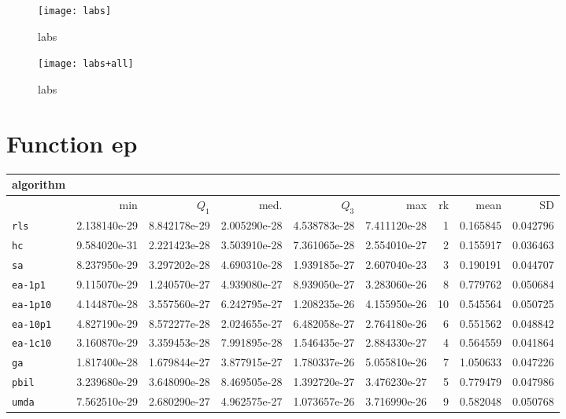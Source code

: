 \begin{center}
\begin{figure}[h]
\centering
\texttt{[image: labs]}
\caption{labs}
\end{figure}
\end{center}

\begin{center}
\begin{figure}[h]
\centering
\texttt{[image: labs+all]}
\caption{labs}
\end{figure}
\end{center}

\newpage

\section{Function ep}
\begin{center}
\begin{tabular}{@{}l*{5}{>{{}}N{1}{2}}>{{}}N{2}{0}N{1}{3}N{1}{3}@{}}
\toprule
{algorithm} &  &  \\
\midrule
& {min} & {$Q_1$} & {med.} & {$Q_3$} & {max} & {rk} & {mean} & {SD} \\
\midrule
\verb|rls| & 2.138140e-29 & {\color{blue}} 8.842178e-29 & {\color{blue}} 2.005290e-28 & {\color{blue}} 4.538783e-28 & {\color{blue}} 7.411120e-28 & 1 & 0.165845 & 0.042796 \\
 \verb|hc| & {\color{blue}} 9.584020e-31 & 2.221423e-28 & 3.503910e-28 & 7.361065e-28 & 2.554010e-27 & 2 & 0.155917 & 0.036463 \\
 \verb|sa| & 8.237950e-29 & 3.297202e-28 & 4.690310e-28 & 1.939185e-27 & 2.607040e-23 & 3 & 0.190191 & 0.044707 \\
 \verb|ea-1p1| & 9.115070e-29 & 1.240570e-27 & 4.939080e-27 & 8.939050e-27 & 3.283060e-26 & 8 & 0.779762 & 0.050684 \\
 \verb|ea-1p10| & 4.144870e-28 & 3.557560e-27 & 6.242795e-27 & 1.208235e-26 & 4.155950e-26 & 10 & 0.545564 & 0.050725 \\
 \verb|ea-10p1| & 4.827190e-29 & 8.572277e-28 & 2.024655e-27 & 6.482058e-27 & 2.764180e-26 & 6 & 0.551562 & 0.048842 \\
 \verb|ea-1c10| & 3.160870e-29 & 3.359453e-28 & 7.991895e-28 & 1.546435e-27 & 2.884330e-27 & 4 & 0.564559 & 0.041864 \\
 \verb|ga| & 1.817400e-28 & 1.679844e-27 & 3.877915e-27 & 1.780337e-26 & 5.055810e-26 & 7 & 1.050633 & 0.047226 \\
 \verb|pbil| & 3.239680e-29 & 3.648090e-28 & 8.469505e-28 & 1.392720e-27 & 3.476230e-27 & 5 & 0.779479 & 0.047986 \\
 \verb|umda| & 7.562510e-29 & 2.680290e-27 & 4.962575e-27 & 1.073657e-26 & 3.716990e-26 & 9 & 0.582048 & 0.050768 \\
 \bottomrule
\end{tabular}
\end{center}

